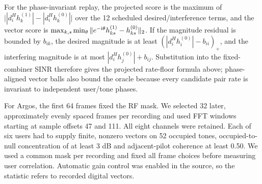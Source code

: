 \documentclass[lineno,pdflatex,sn-nature]{sn-jnl}
\begin{document}
For the phase-invariant replay, the projected score is the maximum of \(\big||d_i^Hh_k^{(1)}|-|d_i^Hh_k^{(0)}|\big|\) over the 12 scheduled desired/interference terms, and the vector score is \(\max_{k,s}\min_\theta\|e^{-{\rm i}\theta}h_{ks}^{(1)}-h_{ks}^{(0)}\|_2\). If the magnitude residual is bounded by \(b_{ik}\), the desired magnitude is at least \((|d_i^Hh_i^{(0)}|-b_{ii})_+\), and the interfering magnitude is at most \(|d_i^Hh_j^{(0)}|+b_{ij}\). Substitution into the fixed-combiner SINR therefore gives the projected rate-floor formula above; phase-aligned vector balls also bound the oracle because every candidate pair rate is invariant to independent user/tone phases.


For Argos, the first 64 frames fixed the RF mask. We selected 32 later, approximately evenly spaced frames per recording and used FFT windows starting at sample offsets 47 and 111. All eight channels were retained. Each of six users had to supply finite, nonzero vectors on 52 occupied tones, occupied-to-null concentration of at least 3 dB and adjacent-pilot coherence at least 0.50. We used a common mask per recording and fixed all frame choices before measuring user correlation. Automatic gain control was enabled in the source, so the statistic refers to recorded digital vectors.
\end{document}
